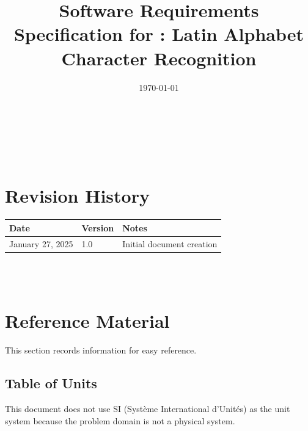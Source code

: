 \documentclass[12pt]{article}
\begin{document}
\title{Software Requirements Specification for \progname: Latin Alphabet Character Recognition} 
\author{\authname}
\date{\today}
	
\maketitle

~\newpage


\tableofcontents

~\newpage

\section*{Revision History}

\begin{tabularx}{\textwidth}{p{3cm}p{2cm}X}
\toprule {\bf Date} & {\bf Version} & {\bf Notes}\\
\midrule
January 27, 2025 & 1.0 & Initial document creation \\
\bottomrule
\end{tabularx}

~\\

~\newpage

\section{Reference Material}

This section records information for easy reference.

\subsection{Table of Units}

This document does not use SI (Syst\`{e}me International d'Unit\'{e}s) as the
unit system because the problem domain is not a physical system.
~\newline

\end{document}
